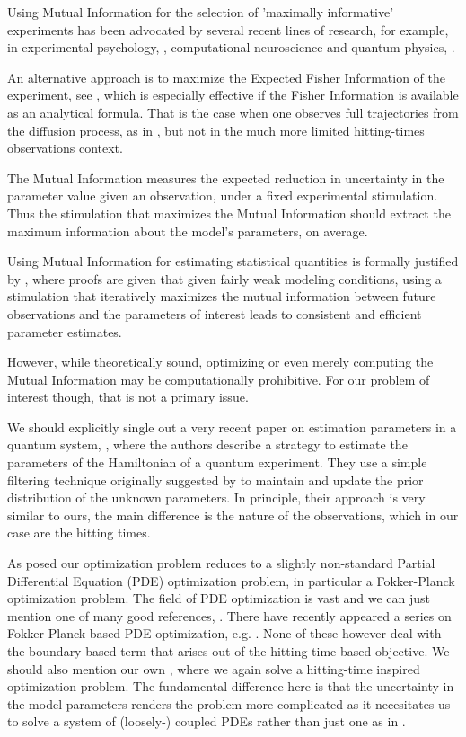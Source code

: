 \documentclass{article}
\begin{document}
Using Mutual Information for the selection of 'maximally informative'
experiments has been advocated by several recent lines of research, for example,
in experimental psychology, \cite{Cavagnaro2010,Myung2013}, computational
neuroscience \cite{Paninski2006a,Paninski2005,Lewi2009} and quantum physics,
\cite{Granade2012}.
 
An alternative approach is to maximize the Expected Fisher Information of the
experiment, see \cite{Hooker2015}, which is especially effective if the Fisher
Information is available as an analytical formula. That is the case when one
observes full trajectories from the diffusion process, as in \cite{Hooker2015},
 but not in the much more limited hitting-times observations context. 
 
The Mutual Information measures the expected reduction in uncertainty in the
parameter value given an observation, under a fixed experimental stimulation.
Thus the stimulation that maximizes the Mutual Information should extract the
maximum information about the model's parameters, on average.

Using Mutual Information for estimating statistical quantities is formally
justified by \cite{Paninski2005}, where proofs are given that given fairly weak
modeling conditions, using a stimulation that iteratively maximizes the mutual
information between future observations and the parameters of
interest leads to consistent and efficient parameter estimates.
  
However, while theoretically sound, optimizing or even merely computing the
Mutual Information may be computationally prohibitive. For our problem of interest though, that is
not a primary issue. 

We should explicitly single out a very recent paper on estimation
parameters in a quantum system,  
\cite{Granade2012}, where the authors describe a strategy to estimate
the parameters of the Hamiltonian of a quantum experiment. They use a simple
filtering technique originally suggested by \cite{Liu2001} to maintain and
update the prior distribution of the unknown parameters. In principle, their
approach is very similar to ours, the main difference is the nature of the
observations, which in our case are the hitting times.

As posed our optimization problem reduces to a slightly non-standard Partial
Differential Equation (PDE) optimization problem, in particular a
Fokker-Planck optimization problem. The field of PDE optimization is vast and we can just mention one of many good
references, \cite{Borzi2012}. There have recently appeared a series on
Fokker-Planck based PDE-optimization, e.g. \cite{Annunziato2010,Annunziato2014}.
None of these however deal with the boundary-based term that arises out of the
hitting-time based objective. We should also mention our own \cite{Iolov2014a},
where we again solve a hitting-time inspired optimization problem. The
fundamental difference here is that the uncertainty in the model parameters
renders the problem more complicated as it necesitates us to solve a system of
(loosely-) coupled PDEs rather than just one as in \cite{Iolov2014a}.
\end{document}
